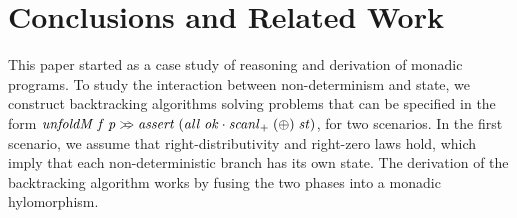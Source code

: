 \documentclass{llncs}
\newcommand{\Varid}[1]{\mathit{#1}}
\let\Varid\mathit
\begin{document}
%
\section{Conclusions and Related Work}
\label{sec:conclusion}

This paper started as a case study of reasoning and derivation of monadic programs.
To study the interaction between non-determinism and state, we
construct backtracking algorithms solving problems that can be specified in the form \ensuremath{\Varid{unfoldM}\;\Varid{f}\;\Varid{p}\mathrel{\hstretch{0.7}{>\!\!=\!\!\!>}}\Varid{assert}\;(\Varid{all}\;\Varid{ok}\mathbin{\cdot}\Varid{scanl}_{+}\;(\oplus)\;\Varid{st})}, for two scenarios.
In the first scenario, we assume that right-distributivity and right-zero laws hold, which imply that each non-deterministic branch has its own state.
The derivation of the backtracking algorithm works by fusing the two phases into a monadic hylomorphism.
\end{document}
